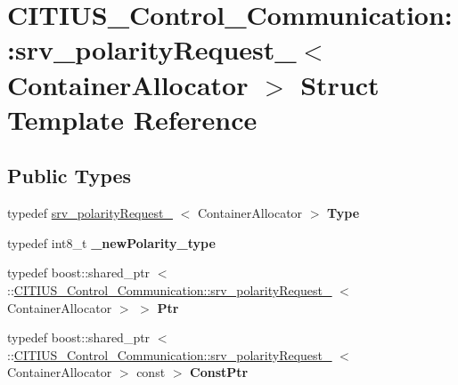 \hypertarget{struct_c_i_t_i_u_s___control___communication_1_1srv__polarity_request__}{\section{\-C\-I\-T\-I\-U\-S\-\_\-\-Control\-\_\-\-Communication\-:\-:srv\-\_\-polarity\-Request\-\_\-$<$ \-Container\-Allocator $>$ \-Struct \-Template \-Reference}
\label{struct_c_i_t_i_u_s___control___communication_1_1srv__polarity_request__}
}
\subsection*{\-Public \-Types}
\begin{DoxyCompactItemize}
\item 
\hypertarget{struct_c_i_t_i_u_s___control___communication_1_1srv__polarity_request___ae02489834c50c66c59db0f6ae67b5497}{typedef \hyperlink{struct_c_i_t_i_u_s___control___communication_1_1srv__polarity_request__}{srv\-\_\-polarity\-Request\-\_\-}\*
$<$ \-Container\-Allocator $>$ {\bfseries \-Type}}\label{struct_c_i_t_i_u_s___control___communication_1_1srv__polarity_request___ae02489834c50c66c59db0f6ae67b5497}

\item 
\hypertarget{struct_c_i_t_i_u_s___control___communication_1_1srv__polarity_request___a4a84a4bd2ff8994aa74f47654728856d}{typedef int8\-\_\-t {\bfseries \-\_\-new\-Polarity\-\_\-type}}\label{struct_c_i_t_i_u_s___control___communication_1_1srv__polarity_request___a4a84a4bd2ff8994aa74f47654728856d}

\item 
\hypertarget{struct_c_i_t_i_u_s___control___communication_1_1srv__polarity_request___a312f8c1528030f2b7b99c22961cb01a4}{typedef boost\-::shared\-\_\-ptr\*
$<$ \-::\hyperlink{struct_c_i_t_i_u_s___control___communication_1_1srv__polarity_request__}{\-C\-I\-T\-I\-U\-S\-\_\-\-Control\-\_\-\-Communication\-::srv\-\_\-polarity\-Request\-\_\-}\*
$<$ \-Container\-Allocator $>$ $>$ {\bfseries \-Ptr}}\label{struct_c_i_t_i_u_s___control___communication_1_1srv__polarity_request___a312f8c1528030f2b7b99c22961cb01a4}

\item 
\hypertarget{struct_c_i_t_i_u_s___control___communication_1_1srv__polarity_request___a41ba0211470f8c4bb5a145219fe1df63}{typedef boost\-::shared\-\_\-ptr\*
$<$ \-::\hyperlink{struct_c_i_t_i_u_s___control___communication_1_1srv__polarity_request__}{\-C\-I\-T\-I\-U\-S\-\_\-\-Control\-\_\-\-Communication\-::srv\-\_\-polarity\-Request\-\_\-}\*
$<$ \-Container\-Allocator $>$ const  $>$ {\bfseries \-Const\-Ptr}}\label{struct_c_i_t_i_u_s___control___communication_1_1srv__polarity_request___a41ba0211470f8c4bb5a145219fe1df63}

\end{DoxyCompactItemize}
